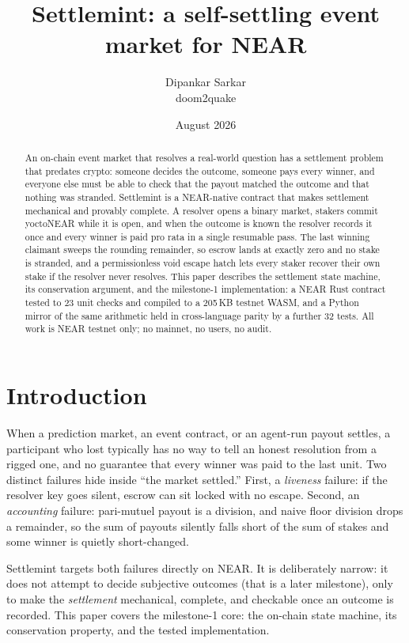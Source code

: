 \documentclass[11pt]{article}
\title{\textbf{Settlemint: a self-settling event market for NEAR}}
\author{Dipankar Sarkar \\ \small doom2quake}
\date{August 2026}
\begin{document}
\maketitle

\begin{abstract}
An on-chain event market that resolves a real-world question has a settlement
problem that predates crypto: someone decides the outcome, someone pays every
winner, and everyone else must be able to check that the payout matched the
outcome and that nothing was stranded. Settlemint is a NEAR-native contract that
makes settlement mechanical and provably complete. A resolver opens a binary
market, stakers commit yoctoNEAR while it is open, and when the outcome is known
the resolver records it once and every winner is paid pro rata in a single
resumable pass. The last winning claimant sweeps the rounding remainder, so
escrow lands at exactly zero and no stake is stranded, and a permissionless void
escape hatch lets every staker recover their own stake if the resolver never
resolves. This paper describes the settlement state machine, its conservation
argument, and the milestone-1 implementation: a NEAR Rust contract tested to 23
unit checks and compiled to a 205\,KB testnet WASM, and a Python mirror of the
same arithmetic held in cross-language parity by a further 32 tests. All work is
NEAR testnet only; no mainnet, no users, no audit.
\end{abstract}

\section{Introduction}

When a prediction market, an event contract, or an agent-run payout settles, a
participant who lost typically has no way to tell an honest resolution from a
rigged one, and no guarantee that every winner was paid to the last unit. Two
distinct failures hide inside ``the market settled.'' First, a \emph{liveness}
failure: if the resolver key goes silent, escrow can sit locked with no escape.
Second, an \emph{accounting} failure: pari-mutuel payout is a division, and naive
floor division drops a remainder, so the sum of payouts silently falls short of
the sum of stakes and some winner is quietly short-changed.

Settlemint targets both failures directly on NEAR. It is deliberately narrow: it
does not attempt to decide subjective outcomes (that is a later milestone), only
to make the \emph{settlement} mechanical, complete, and checkable once an outcome
is recorded. This paper covers the milestone-1 core: the on-chain state machine,
its conservation property, and the tested implementation.
\end{document}
